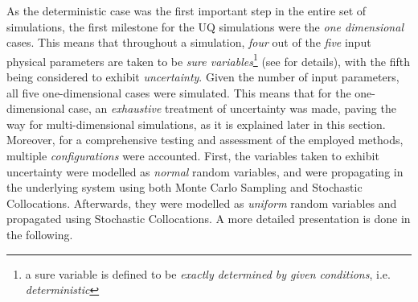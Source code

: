 	As the deterministic case was the first important step in the entire set of simulations, the first milestone for the UQ simulations were the \emph{one dimensional} cases. This means that throughout a simulation, \emph{four} out of the \emph{five} input physical parameters are taken to be \emph{sure variables}\footnote{a sure variable is defined to be \emph{exactly determined by given conditions}, i.e. \emph{deterministic}} (see  \cite{Le02} for details), with the fifth being considered to exhibit \emph{uncertainty}. Given the number of input parameters, all five one-dimensional cases were simulated. This means that for the one-dimensional case, an \emph{exhaustive} treatment of uncertainty was made, paving the way for multi-dimensional simulations, as it is explained later in this section. Moreover, for a comprehensive testing and assessment of the employed methods, multiple \emph{configurations} were accounted. First, the variables taken to exhibit uncertainty were modelled as \emph{normal} random variables, and were propagating in the underlying system using both Monte Carlo Sampling and Stochastic Collocations. Afterwards, they were modelled as \emph{uniform} random variables and propagated using Stochastic Collocations. A more detailed presentation is done in the following.
	
